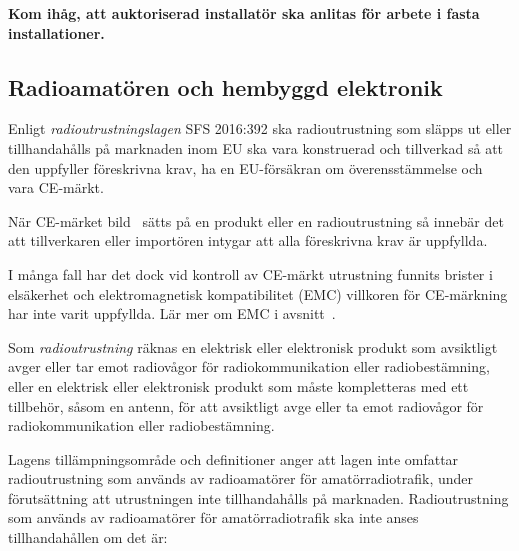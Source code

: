 \begin{center}
\begin{minipage}{0.19\columnwidth}
\Huge{\selectfont{}\relax}
\end{minipage}
\begin{minipage}{0.7\columnwidth}
\textbf{Kom ihåg, att auktoriserad installatör ska anlitas för arbete
i fasta installationer.}
\end{minipage}
\end{center}


\subsection{Radioamatören och hembyggd elektronik}

Enligt \emph{radioutrustningslagen} SFS 2016:392 \cite{SFS2016:392} ska
radioutrustning som släpps ut eller tillhandahålls på marknaden inom EU ska vara
konstruerad och tillverkad så att den uppfyller föreskrivna krav, ha en
EU-försäkran om överensstämmelse och vara CE-märkt.

När CE-märket bild~ sätts på en produkt eller en
radioutrustning så innebär det att tillverkaren eller importören intygar att
alla föreskrivna krav är uppfyllda.

I många fall har det dock vid kontroll av CE-märkt utrustning funnits brister
i elsäkerhet och elektromagnetisk kompatibilitet (EMC) villkoren för CE-märkning
har inte varit uppfyllda. Lär mer om EMC i avsnitt~.

Som \emph{radioutrustning} räknas en elektrisk eller elektronisk produkt som
avsiktligt avger eller tar emot radiovågor för radiokommunikation eller
radiobestämning, eller en elektrisk eller elektronisk produkt som måste
kompletteras med ett tillbehör, såsom en antenn, för att avsiktligt avge
eller ta emot radiovågor för radiokommunikation eller radiobestämning.

Lagens tillämpningsområde och definitioner anger att lagen inte omfattar
radioutrustning som används av radioamatörer för amatörradiotrafik, under
förutsättning att utrustningen inte tillhandahålls på marknaden.
Radioutrustning som används av radioamatörer för amatörradiotrafik ska inte
anses tillhandahållen om det är:

